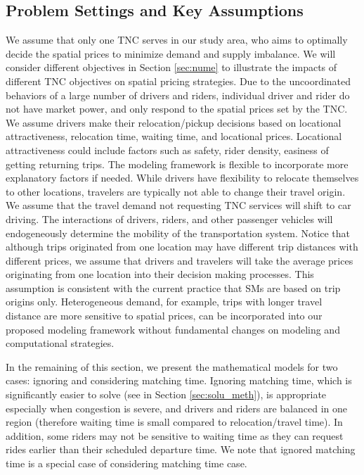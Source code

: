 \documentclass[review]{elsarticle}
\begin{document}
\subsection{Problem Settings and Key Assumptions}
We assume that only one TNC serves in our study area, who aims to optimally decide the spatial prices to minimize demand and supply imbalance. We will consider different objectives in Section \ref{sec:nume} to illustrate the impacts of different TNC objectives on spatial pricing strategies. Due to the uncoordinated behaviors of a large number of drivers and riders, individual driver and rider do not have market power, and only respond to the spatial prices set by the TNC. We assume drivers make their relocation/pickup decisions based on locational attractiveness, relocation time, waiting time, and locational prices. Locational attractiveness could include factors such as safety, rider density, easiness of getting returning trips. The modeling framework is flexible to incorporate more explanatory factors if needed.  While drivers have flexibility to relocate themselves to other locations, travelers are typically not able to change their travel origin. We assume that the travel demand not requesting TNC services will shift to car driving. The interactions of drivers, riders, and other passenger vehicles will endogeneously determine the mobility of the transportation system. Notice that although trips originated from one location may have different trip distances with different prices, we assume that drivers and travelers will take the average prices originating from one location into their decision making processes. This assumption is consistent with the current practice that SMs are based on trip origins only. Heterogeneous demand, for example, trips with longer travel distance are more sensitive to spatial prices, can be incorporated into our proposed modeling framework without fundamental changes on  modeling and computational strategies. 

In the remaining of this section, we present the mathematical models for two cases: ignoring and considering matching time.  Ignoring matching time, which is significantly easier to solve (see in Section \ref{sec:solu_meth}),  is appropriate especially when congestion is severe, and drivers and riders are balanced in one region (therefore waiting time is small compared to relocation/travel time). In addition, some riders may not be sensitive to waiting time as they can request rides earlier than their scheduled departure time. We note that ignored matching time is a special case of considering matching time case.
\end{document}
